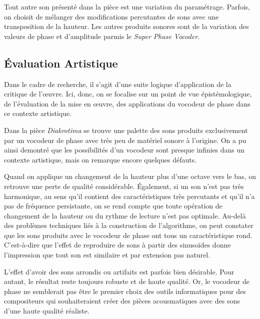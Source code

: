 Tout autre son présenté dans la pièce est une variation du paramétrage. Parfois, on choisit de mélanger des modifications percutantes de sons avec une transposition de la hauteur. Les autres produits sonores sont de la variation des valeurs de phase et d'amplitude parmis le \textit{Super Phase Vocoder}. 

\subsection{Évaluation Artistique}

Dans le cadre de recherche, il s'agit d'une suite logique d'application de la critique de l'œuvre. Ici, donc, on se focalise sur un point de vue épistémologique, de l'évaluation de la mise en œuvre, des applications du vocodeur de phase dans ce contexte artistique. 

Dans la pièce \textit{Diakrotima} se trouve une palette des sons produits exclusivement par un vocodeur de phase avec très peu de matériel sonore à l'origine. On a pu ainsi demontré que les possibilités d'un vocodeur sont presque infinies dans un contexte artistique, mais on remarque encore quelques défauts. 

Quand on applique un changement de la hauteur plus d'une octave vers le bas, on retrouve une perte de qualité considérable. Également, si un son n'est pas très harmonique, au sens qu'il contient des caractéristiques très percutants et qu'il n'a pas de fréquence persistante, on se rend compte que toute opération de changement de la hauteur ou du rythme de lecture n'est pas optimale. Au-delà des problèmes techniques liés à la construction de l'algorithme, on peut constater que les sons produits avec le vocodeur de phase ont tous un caractéristique rond. C'est-à-dire que l'effet de reproduire de sons à partir des sinusoïdes donne l'impression que tout son est similaire et par extension pas naturel. 

L'effet d'avoir des sons arrondis ou artifaits est parfois bien désirable. Pour autant, le résultat reste toujours robuste et de haute qualité. Or, le vocodeur de phase ne semblerait pas être le premier choix des outils informatiques pour des compositeurs qui souhaiteraient créer des pièces acousmatiques avec des sons d'une haute qualité réaliste.